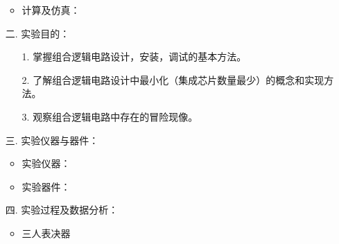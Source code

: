 \documentclass[UTF8]{ctexart}
\begin{document}
\begin{enumerate}
\begin{itemize}
\begin{itemize}
\begin{itemize}
                              \end{itemize}
                    \end{itemize}


              \item 计算及仿真：


          \end{itemize}
    \item[二.]  实验目的：
          \begin{itemize}
              \item [1.] 掌握组合逻辑电路设计，安装，调试的基本方法。
              \item [2.] 了解组合逻辑电路设计中最小化（集成芯片数量最少）的概念和实现方法。
              \item [3.] 观察组合逻辑电路中存在的冒险现像。
          \end{itemize}
    \item[三.]  实验仪器与器件：
          \begin{itemize}
              \item 实验仪器：\\
              \item 实验器件：\\
          \end{itemize}
    \item[四.]  实验过程及数据分析：
          \begin{itemize}
              \item 三人表决器\\

\end{itemize}
\end{enumerate}
\end{document}
